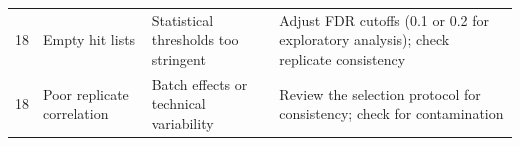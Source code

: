 \begin{table}[htbp]
\begin{tabular}{p{2.0cm}p{3.0cm}p{3.8cm}p{5.6cm}}
18 & Empty hit lists & Statistical thresholds too stringent & Adjust FDR cutoffs (0.1 or 0.2 for exploratory analysis); check replicate consistency \\
18 & Poor replicate correlation & Batch effects or technical variability & Review the selection protocol for consistency; check for contamination \\
\bottomrule
\end{tabular}
\end{table}
